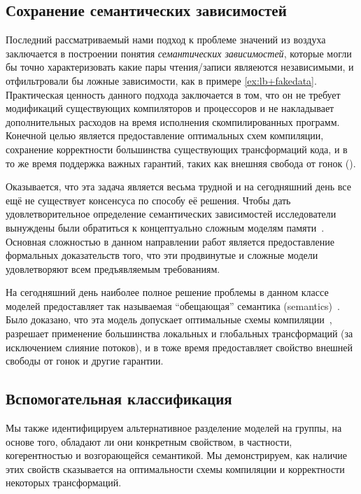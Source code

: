 \subsection{Сохранение семантических зависимостей}
\label{sec:analysis:sdeprf}

Последний рассматриваемый нами подход к проблеме значений из воздуха 
заключается в построении понятия \emph{семантических зависимостей}, 
которые могли бы точно характеризовать какие пары чтения/записи
являеются независимыми, и отфильтровали бы ложные зависимости, 
как в примере \ref{ex:lb+fakedata}.
Практическая ценность данного подхода заключается в том, что 
он не требует модификаций существующих компиляторов 
и процессоров и не накладывает дополнительных 
расходов на время исполнения скомпилированных программ. 
Конечной целью является предоставление оптимальных схем компиляции, 
сохранение корректности большинства существующих трансформаций кода, 
и в то же время поддержка важных гарантий, 
таких как внешняя свобода от гонок (\eDRF).

Оказывается, что эта задача является весьма трудной 
и на сегодняшний день все ещё не существует консенсуса 
по способу её решения. 
Чтобы дать удовлетворительное определение семантических зависимостей 
исследователи вынуждены были обратиться к концептуально 
сложным моделям памяти~\cite{Jagadeesan-al:ESOP10, Kang-al:POPL17, 
Jeffrey-Riely:LICS16, PichonPharabod-Sewell:POPL16, 
Chakraborty-Vafeiadis:POPL19, Paviotti-al:ESOP20}.
Основная сложностью в данном направлении работ 
является предоставление формальных доказательств того, 
что эти продвинутые и сложные модели удовлетворяют 
всем предъявляемым требованиям. 

На сегодняшний день наиболее полное решение 
проблемы в данном классе моделей предоставляет 
так называемая ``обещающая'' семантика 
(\Promising semantics)~\cite{Kang-al:POPL17, Lee-al:PLDI20}. 
Было доказано, что эта модель допускает 
оптимальные схемы компиляции~\cite{Podkopaev-al:POPL19}, 
разрешает применение большинства локальных и глобальных 
трансформаций (за исключением слияние потоков), 
и в тоже время предоставляет 
свойство внешней свободы от гонок и другие гарантии. 

\subsection{Вспомогательная классификация}
\label{sec:analysis:other}

Мы также идентифицируем альтернативное разделение моделей на группы, 
на основе того, обладают ли они конкретным свойством, 
в частности, когерентностью и возгорающейся семантикой. 
Мы демонстрируем, как наличие этих свойств сказывается 
на оптимальности схемы компиляции и корректности некоторых трансформаций. 

